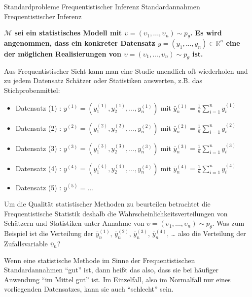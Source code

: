 \documentclass[
  8pt,
  ignorenonframetext,
]{beamer}
\newcommand{\ups}{\upsilon}
\begin{document}
\begin{frame}{Standardprobleme Frequentistischer Inferenz}
\protect\hypertarget{standardprobleme-frequentistischer-inferenz-2}{}
Standardannahmen Frequentistischer Inferenz

\footnotesize

\textbf{\(\mathcal{M}\) sei ein statistisches Modell mit
\(\ups = (\ups_1,...,\ups_n) \sim p_\theta\). Es wird angenommen, dass
ein konkreter Datensatz \(y = (y_1,...,y_n) \in \mathbb{R}^n\) eine der
möglichen Realisierungen von
\(\ups = (\ups_1,...,\ups_n) \sim p_\theta\) ist.}

Aus Frequentistischer Sicht kann man eine Studie unendlich oft
wiederholen und zu jedem Datensatz Schätzer oder Statistiken auswerten,
z.B. das Stichprobenmittel:

\footnotesize
\begin{itemize}
\item[] Datensatz (1) : $y^{(1)} = \left(y_1^{(1)}, y_2^{(1)}, ...,y_n^{(1)}\right)$
                        mit $\bar{y}_n^{(1)} = \frac{1}{n}\sum_{i=1}^n y_i^{(1)}$
\item[] Datensatz (2) : $y^{(2)} = \left(y_1^{(2)}, y_2^{(2)}, ...,y_n^{(2)}\right)$
                        mit $\bar{y}_n^{(2)} = \frac{1}{n}\sum_{i=1}^n y_i^{(2)}$
\item[] Datensatz (3) : $y^{(3)} = \left(y_1^{(3)}, y_2^{(3)}, ...,y_n^{(3)}\right)$
                        mit $\bar{y}_n^{(3)} = \frac{1}{n}\sum_{i=1}^n y_i^{(3)}$
\item[] Datensatz (4) : $y^{(4)} = \left(y_1^{(4)}, y_2^{(4)}, ...,y_n^{(4)}\right)$
                        mit $\bar{y}_n^{(4)} = \frac{1}{n}\sum_{i=1}^n y_i^{(4)}$
\item[] Datensatz (5) : $y^{(5)} = ...$
\end{itemize}

Um die Qualität statistischer Methoden zu beurteilen betrachtet die
Frequentistische Statistik deshalb die Wahrscheinlichkeitsverteilungen
von Schätzern und Statistiken unter Annahme von
\(\ups = (\ups_1,...,\ups_n) \sim p_\theta\). Was zum Beispiel ist die
Verteilung der \(\bar{y}_n^{(1)}\), \(\bar{y}_n^{(2)}\),
\(\bar{y}_n^{(3)}\), \(\bar{y}_n^{(4)}\), \ldots{} also die Verteilung
der Zufallsvariable \(\bar{\ups}_n\)?

Wenn eine statistische Methode im Sinne der Frequentistischen
Standardannahmen ``gut'' ist, dann heißt das also, dass sie bei häufiger
Anwendung ``im Mittel gut'' ist. Im Einzelfall, also im Normalfall nur
eines vorliegenden Datensatzes, kann sie auch ``schlecht'' sein.
\end{frame}
\end{document}
